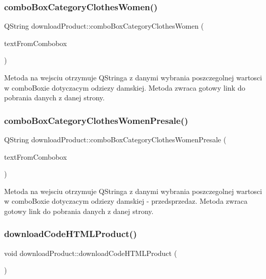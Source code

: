 \subsubsection{\texorpdfstring{combo\+Box\+Category\+Clothes\+Women()}{comboBoxCategoryClothesWomen()}}
{\footnotesize\ttfamily Q\+String download\+Product\+::combo\+Box\+Category\+Clothes\+Women (\begin{DoxyParamCaption}\item[{Q\+String}]{text\+From\+Combobox }\end{DoxyParamCaption})}

Metoda na wejsciu otrzymuje Q\+Stringa z danymi wybrania poszczegolnej wartosci w combo\+Boxie dotyczacym odziezy damskiej. Metoda zwraca gotowy link do pobrania danych z danej strony. \mbox{\label{classdownload_product_aa5d985f8ce454e685578d5d574fb02ef}} 
\subsubsection{\texorpdfstring{combo\+Box\+Category\+Clothes\+Women\+Presale()}{comboBoxCategoryClothesWomenPresale()}}
{\footnotesize\ttfamily Q\+String download\+Product\+::combo\+Box\+Category\+Clothes\+Women\+Presale (\begin{DoxyParamCaption}\item[{Q\+String}]{text\+From\+Combobox }\end{DoxyParamCaption})}

Metoda na wejsciu otrzymuje Q\+Stringa z danymi wybrania poszczegolnej wartosci w combo\+Boxie dotyczacym odziezy damskiej -\/ przedsprzedaz. Metoda zwraca gotowy link do pobrania danych z danej strony. \mbox{\label{classdownload_product_a0c865ae0d258f5e8669cf4a9dc395274}} 
\subsubsection{\texorpdfstring{download\+Code\+H\+T\+M\+L\+Product()}{downloadCodeHTMLProduct()}}
{\footnotesize\ttfamily void download\+Product\+::download\+Code\+H\+T\+M\+L\+Product (\begin{DoxyParamCaption}{ }\end{DoxyParamCaption})}

